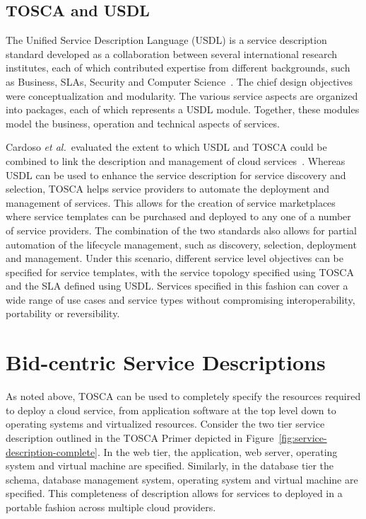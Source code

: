 \documentclass[10pt, conference, compsocconf]{IEEEtran}
\begin{document}
\subsection{TOSCA and USDL}

The Unified Service Description Language (USDL) \cite{cardoso2010towards} is a service description standard developed as a collaboration between several international research institutes, each of which contributed expertise from different backgrounds, such as Business, SLAs, Security and Computer Science~\cite{oberle_unified_2013}. The chief design objectives were conceptualization and modularity. The various service aspects are organized into packages, each of which represents a USDL module. Together, these modules model the business, operation and technical aspects of services.

Cardoso \textit{et al.}~evaluated the extent to which USDL and TOSCA could be combined to link the description and management of cloud services~\cite{cardoso_cloud_2013}. Whereas USDL can be used to enhance the service description for service discovery and selection, TOSCA helps service providers to automate the deployment and management of services. This allows for the creation of service marketplaces where service templates can be purchased and deployed to any one of a number of service providers. The combination of the two standards also allows for partial automation of the lifecycle management, such as discovery, selection, deployment and management. Under this scenario, different service level objectives can be specified for service templates, with the service topology specified using TOSCA and the SLA defined using USDL. Services specified in this fashion can cover a wide range of use cases and service types without compromising interoperability, portability or reversibility.


\section{Bid-centric Service Descriptions}
\label{sec:bid-centric-service-descriptions}

As noted above, TOSCA can be used to completely specify the resources required to deploy a cloud service,  from application software at the top level down to operating systems and virtualized resources. Consider the two tier service description outlined in the TOSCA Primer \cite{oasis2013toscaprimer} depicted in Figure~\ref{fig:service-description-complete}. In the web tier, the application, web server, operating system and virtual machine are specified. Similarly, in the database tier the schema, database management system, operating system and virtual machine are specified. This completeness of description allows for services to deployed in a portable fashion across multiple cloud providers.
\end{document}

